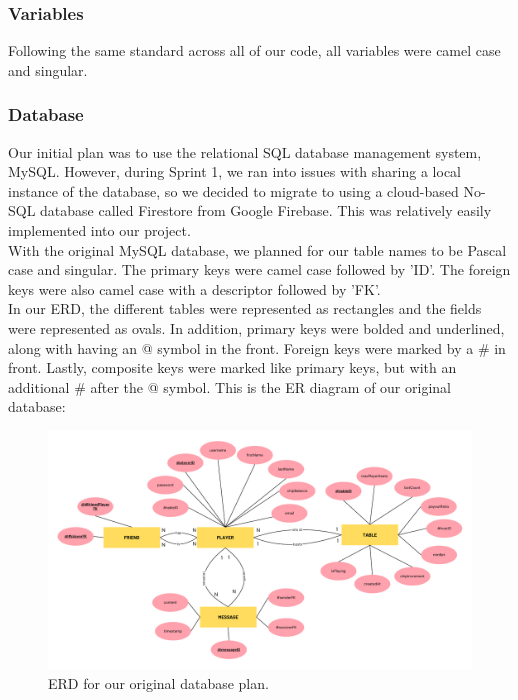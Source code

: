 \subsubsection{Variables}
Following the same standard across all of our code, all variables were camel case and singular. 

\subsubsection{Database}
\label{sec:database}
\noindent Our initial plan was to use the relational SQL database management system, MySQL. However, during Sprint 1, we ran into issues with sharing a local instance of the database, so we decided to migrate to using a cloud-based No-SQL database called Firestore from Google Firebase. This was relatively easily implemented into our project.\\

\noindent With the original MySQL database, we planned for our table names to be Pascal case and singular. The primary keys were camel case followed by 'ID'. The foreign keys were also camel case with a descriptor followed by 'FK'.\\

\noindent In our ERD, the different tables were represented as rectangles and the fields were represented as ovals. In addition, primary keys were bolded and underlined, along with having an @ symbol in the front. Foreign keys were marked by a \# in front. Lastly, composite keys were marked like primary keys, but with an additional \# after the @ symbol. This is the ER diagram of our original database: 

\pagebreak

\begin{figure}[hbt!]
    \centering
    \includegraphics[width=1.0\linewidth]{figures/SE Database ERD.pdf}
    \caption{ERD for our original database plan.}
    \label{fig: original ERD}
\end{figure} 

